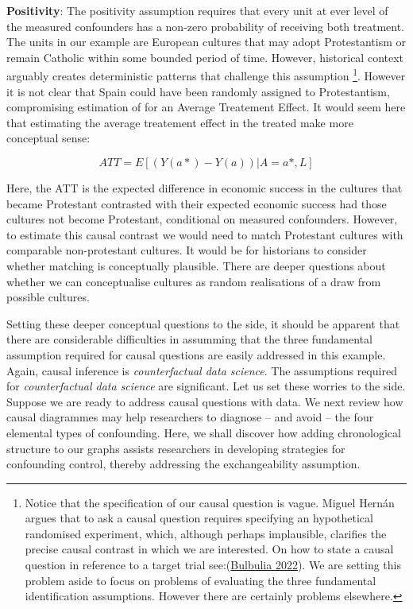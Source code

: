 \documentclass[
  singlecolumn]{report}
\begin{document}
\textbf{Positivity}: The positivity assumption requires that every unit
at ever level of the measured confounders has a non-zero probability of
receiving both treatment. The units in our example are European cultures
that may adopt Protestantism or remain Catholic within some bounded
period of time. However, historical context arguably creates
deterministic patterns that challenge this assumption \footnote{Notice
  that the specification of our causal question is vague. Miguel Hernán
  argues that to ask a causal question requires specifying an
  hypothetical randomised experiment, which, although perhaps
  implausible, clarifies the precise causal contrast in which we are
  interested. On how to state a causal question in reference to a target
  trial see:(\protect\hyperlink{ref-bulbulia2022}{Bulbulia 2022}). We
  are setting this problem aside to focus on problems of evaluating the
  three fundamental identification assumptions. However there are
  certainly problems elsewhere.}. However it is not clear that Spain
could have been randomly assigned to Protestantism, compromising
estimation of for an Average Treatement Effect. It would seem here that
estimating the average treatement effect in the treated make more
conceptual sense:

\[ATT = E[(Y(a*)- Y(a))|A = a*, L]\]

Here, the ATT is the expected difference in economic success in the
cultures that became Protestant contrasted with their expected economic
success had those cultures not become Protestant, conditional on
measured confounders. However, to estimate this causal contrast we would
need to match Protestant cultures with comparable non-protestant
cultures. It would be for historians to consider whether matching is
conceptually plausible. There are deeper questions about whether we can
conceptualise cultures as random realisations of a draw from possible
cultures.

Setting these deeper conceptual questions to the side, it should be
apparent that there are considerable difficulties in assumming that the
three fundamental assumption required for causal questions are easily
addressed in this example. Again, causal inference is
\emph{counterfactual data science}. The assumptions required for
\emph{counterfactual data science} are significant. Let us set these
worries to the side. Suppose we are ready to address causal questions
with data. We next review how causal diagrammes may help researchers to
diagnose -- and avoid -- the four elemental types of confounding. Here,
we shall discover how adding chronological structure to our graphs
assists researchers in developing strategies for confounding control,
thereby addressing the exchangeability assumption.
\end{document}
